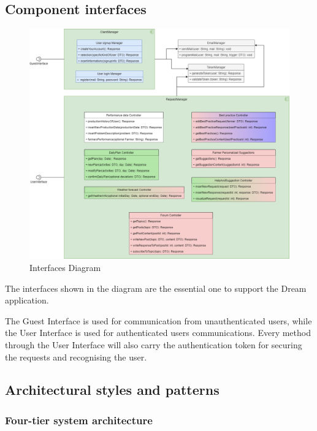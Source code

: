 \documentclass{article}
\begin{document}
        
\newpage

\subsection{Component interfaces}

    \begin{figure} [h]
            \centering
            \includegraphics[width=1\textwidth]{images/ArchitecturalDesign/InterfaceView.png}
            \caption{\label{fig:InterfacesDiagram}Interfaces Diagram}
        \end{figure}

    The interfaces shown in the diagram are the essential one to support the Dream application. \par
    The Guest Interface is used for communication from unauthenticated users, while the User Interface is used for authenticated users communications. Every method through the User Interface will also carry the authentication token for securing the requests and recognising the user. \par


\newpage


\subsection{Architectural styles and patterns}

    \subsubsection{Four-tier system architecture}
    
\end{document}
